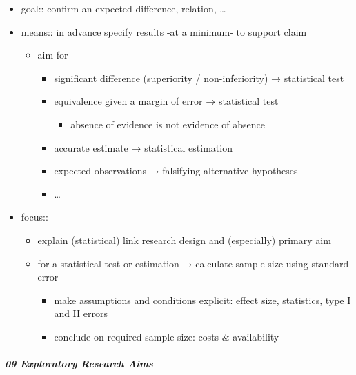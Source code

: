 \documentclass[
]{article}
\providecommand{\tightlist}{%
  \setlength{\itemsep}{0pt}\setlength{\parskip}{0pt}}
\begin{document}
\begin{itemize}
\tightlist
\item
  goal:: confirm an expected difference, relation, \ldots{}
\item
  means:: in advance specify results -at a minimum- to support claim

  \begin{itemize}
  \tightlist
  \item
    aim for

    \begin{itemize}
    \tightlist
    \item
      significant difference (superiority / non-inferiority) →
      statistical test
    \item
      equivalence given a margin of error → statistical test

      \begin{itemize}
      \tightlist
      \item
        absence of evidence is not evidence of absence
      \end{itemize}
    \item
      accurate estimate → statistical estimation
    \item
      expected observations → falsifying alternative hypotheses
    \item
      \ldots{} \\
    \end{itemize}
  \end{itemize}
\item
  focus::

  \begin{itemize}
  \tightlist
  \item
    explain (statistical) link research design and (especially) primary
    aim
  \item
    for a statistical test or estimation → calculate sample size using
    standard error

    \begin{itemize}
    \tightlist
    \item
      make assumptions and conditions explicit: effect size, statistics,
      type I and II errors
    \item
      conclude on required sample size: costs \& availability
    \end{itemize}
  \end{itemize}
\end{itemize}

\hypertarget{exploratory-research-aims}{%
\subparagraph{09 Exploratory Research
Aims}\label{exploratory-research-aims}}
\end{document}

